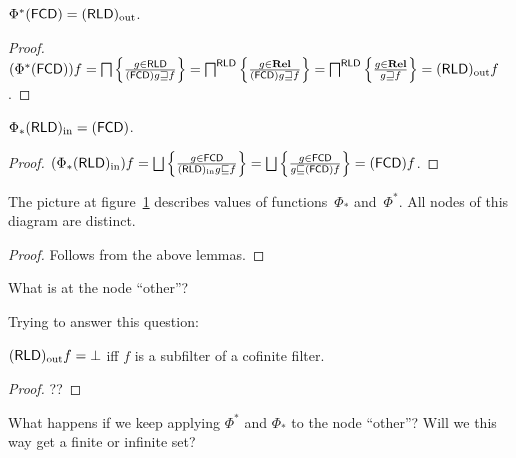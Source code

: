 \begin{lem}
  $\Phi^{\ast}  (\mathsf{FCD}) = (\mathsf{RLD})_{\mathrm{out}}$.
\end{lem}

\begin{proof}
  $(\Phi^{\ast}  (\mathsf{FCD})) f = \bigsqcap \left\{ \frac{ g \in
  \mathsf{RLD} }{ (\mathsf{FCD}) g
  \sqsupseteq f }\right\} = \bigsqcap^{\mathsf{RLD}} \left\{ \frac{ g \in \mathbf{Rel}
  }{ (\mathsf{FCD}) g \sqsupseteq f }\right\} =
  \bigsqcap^{\mathsf{RLD}} \left\{ \frac{ g \in \mathbf{Rel} }{ g
  \sqsupseteq f }\right\} = (\mathsf{RLD})_{\mathrm{out}} f$.
\end{proof}

\begin{lem}
  $\Phi_{\ast} (\mathsf{RLD})_{\mathrm{in}} = (\mathsf{FCD})$.
\end{lem}

\begin{proof}
  $(\Phi_{\ast} \torldin) f = \bigsqcup \setcond{ g
  \in \mathsf{FCD} }{
 \torldin g \sqsubseteq f } = \bigsqcup
  \setcond{ g \in \mathsf{FCD} }{ g \sqsubseteq
  \tofcd f } = \tofcd f$.
\end{proof}

\begin{thm}
The picture at figure~\ref{dia:fcd-rld-gal} describes values of functions~$\Phi_{\ast}$ and~$\Phi^{\ast}$.
All nodes of this diagram are distinct.
\begin{figure}
  \caption{\label{dia:fcd-rld-gal}}
\end{figure}
\end{thm}

\begin{proof}
Follows from the above lemmas.
\end{proof}

\begin{question}
What is at the node ``other''?
\end{question}

Trying to answer this question:

\begin{lem}
$(\mathsf{RLD})_{\mathrm{out}} f=\bot$ iff $f$ is a subfilter of a cofinite
filter.
\end{lem}

\begin{proof}
??
\end{proof}

\begin{question}
What happens if we keep applying $\Phi^{\ast}$ and $\Phi_{\ast}$ to the node ``other''?
Will we this way get a finite or infinite set?
\end{question}
